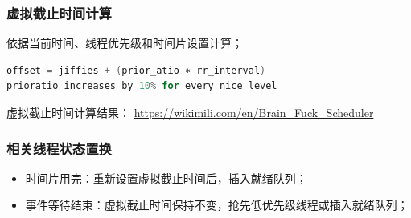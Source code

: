 % 
% 
% 
% 
% 
% 
\begin{frame}[fragile]
    \frametitle{虚拟截止时间计算}

依据当前时间、线程优先级和时间片设置计算；

    \begin{lstlisting}[language = C]
offset = jiffies + (prior_atio ∗ rr_interval)
prioratio increases by 10% for every nice level
    \end{lstlisting}

\pause
虚拟截止时间计算结果： \href{https://wikimili.com/en/Brain_Fuck_Scheduler}{https://wikimili.com/en/Brain\_Fuck\_Scheduler}
\end{frame}
% 
% 
% 
\begin{frame}[fragile]
    \frametitle{相关线程状态置换}
    \begin{itemize}
        \item 时间片用完：重新设置虚拟截止时间后，插入就绪队列；
        \item 事件等待结束：虚拟截止时间保持不变，抢先低优先级线程或插入就绪队列；
    \end{itemize}

\end{frame}
% 
% 
% 
